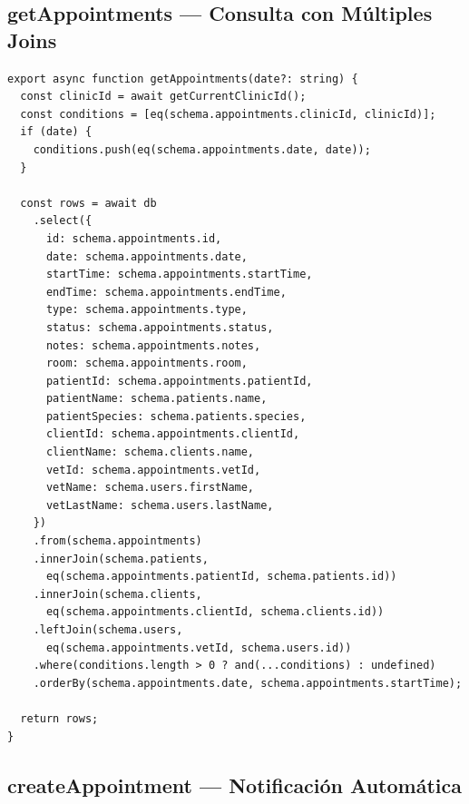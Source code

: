 \subsection{getAppointments --- Consulta con M\'ultiples Joins}

\begin{lstlisting}[style=typescript, caption={getAppointments - Joins con pacientes, clientes y usuarios}]
export async function getAppointments(date?: string) {
  const clinicId = await getCurrentClinicId();
  const conditions = [eq(schema.appointments.clinicId, clinicId)];
  if (date) {
    conditions.push(eq(schema.appointments.date, date));
  }

  const rows = await db
    .select({
      id: schema.appointments.id,
      date: schema.appointments.date,
      startTime: schema.appointments.startTime,
      endTime: schema.appointments.endTime,
      type: schema.appointments.type,
      status: schema.appointments.status,
      notes: schema.appointments.notes,
      room: schema.appointments.room,
      patientId: schema.appointments.patientId,
      patientName: schema.patients.name,
      patientSpecies: schema.patients.species,
      clientId: schema.appointments.clientId,
      clientName: schema.clients.name,
      vetId: schema.appointments.vetId,
      vetName: schema.users.firstName,
      vetLastName: schema.users.lastName,
    })
    .from(schema.appointments)
    .innerJoin(schema.patients,
      eq(schema.appointments.patientId, schema.patients.id))
    .innerJoin(schema.clients,
      eq(schema.appointments.clientId, schema.clients.id))
    .leftJoin(schema.users,
      eq(schema.appointments.vetId, schema.users.id))
    .where(conditions.length > 0 ? and(...conditions) : undefined)
    .orderBy(schema.appointments.date, schema.appointments.startTime);

  return rows;
}
\end{lstlisting}

\subsection{createAppointment --- Notificaci\'on Autom\'atica}

